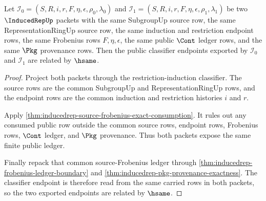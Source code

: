 \begin{theorem}
\label{thm:inducedrep-frobenius-source-row-determinacy}
Let
$\mathcal{I}_0=(S,R,i,r,F,\eta,\epsilon,\rho_0,\lambda_0)$ and
$\mathcal{I}_1=(S,R,i,r,F,\eta,\epsilon,\rho_1,\lambda_1)$ be two
$\InducedRepUp$ packets with the same SubgroupUp source row, the same
RepresentationRingUp source row, the same induction and restriction endpoint
rows, the same Frobenius rows $F,\eta,\epsilon$, the same public $\Cont$
ledger rows, and the same $\Pkg$ provenance rows. Then the public classifier
endpoints exported by $\mathcal{I}_0$ and $\mathcal{I}_1$ are related by
$\hsame$.
\end{theorem}
\begin{proof}
Project both packets through the restriction-induction classifier. The source
rows are the common SubgroupUp and RepresentationRingUp rows, and the endpoint
rows are the common induction and restriction histories $i$ and $r$.

Apply \autoref{thm:inducedrep-source-frobenius-exact-consumption}. It rules out
any consumed public row outside the common source rows, endpoint rows,
Frobenius rows, $\Cont$ ledger, and $\Pkg$ provenance. Thus both packets expose
the same finite public ledger.

Finally repack that common source-Frobenius ledger through
\autoref{thm:inducedrep-frobenius-ledger-boundary} and
\autoref{thm:inducedrep-pkg-provenance-exactness}. The classifier endpoint is
therefore read from the same carried rows in both packets, so the two exported
endpoints are related by $\hsame$.
\end{proof}

